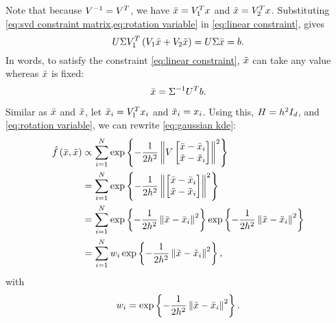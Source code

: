 Note that because $V^{-1} = V^T$, we have $\bar{x} = V_1^T x$ and $\tilde{x} = V_2^T x$.
Substituting \cref{eq:svd constraint matrix,eq:rotation variable} in \cref{eq:linear constraint}, gives
\begin{equation}
	\label{eq:linear constraint after rotation}
	U \Sigma V_1^T \left( V_1 \bar{x} + V_2 \tilde{x} \right)
	= U \Sigma \bar{x} = b.
\end{equation}
In words, to satisfy the constraint \cref{eq:linear constraint}, $\tilde{x}$ can take any value whereas $\bar{x}$ is fixed:
\begin{equation}
	\label{eq:fixed part}
	\bar{x} = \Sigma^{-1} U^T b.
\end{equation}

Similar as $\bar{x}$ and $\tilde{x}$, let $\bar{x}_{i}=V_1^T x_{i}$ and $\tilde{x}_{i}=x_{i}$. Using this, $H=h^2 I_{d}$, and \cref{eq:rotation variable}, we can rewrite \cref{eq:gaussian kde}:
\begin{align}
	\hat{f}\left( \bar{x}, \tilde{x} \right) 
	&\propto \sum_{i=1}^{N}
	\exp\left\{  -\frac{1}{2h^2}
		\left\Vert  V \begin{bmatrix} 
			\bar{x} - \bar{x}_{i} \\ 
			\tilde{x} - \tilde{x}_{i}
		\end{bmatrix} \right\Vert^2
	 \right\} \\
	&= \sum_{i=1}^{N}
	\exp\left\{  -\frac{1}{2h^2}
		\left\Vert  \begin{bmatrix} 
			\bar{x} - \bar{x}_{i} \\ 
			\tilde{x} - \tilde{x}_{i}
		\end{bmatrix} \right\Vert^2
	 \right\}\\
	&=\sum_{i=1}^{N}
	\exp\left\{  -\frac{1}{2h^2} \left\Vert  \bar{x} - \bar{x}_{i}  \right\Vert^2 \right\} 
	\exp\left\{  -\frac{1}{2h^2} \left\Vert  \tilde{x} - \tilde{x}_{i}  \right\Vert^2 \right\}\\
	&=\sum_{i=1}^{N}
	w_{i} \exp\left\{  -\frac{1}{2h^2} \left\Vert  \tilde{x} - \tilde{x}_{i}  \right\Vert^2 \right\},
\end{align}
with
\begin{equation}
	\label{eq:weights constrained simple}
	w_{i} = \exp\left\{  -\frac{1}{2h^2} \left\Vert  \bar{x} - \bar{x}_{i}  \right\Vert^2 \right\}.
\end{equation}

